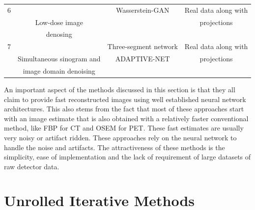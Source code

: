 \begin{table}[ht!]
\begin{tabular}{||c|c|c|c||}
		\hline
		6         & \cite{yang2018low}        &    Wasserstein-GAN & Real data along with            \\ 
		          & Low-dose image            &                    & projections                     \\ 
		          & denosing                  &                    &                                 \\ 
		\hline
		7         & \cite{zhu2020low}         &  Three-segment network  & Real data along with            \\ 
		          & Simultaneous sinogram and &  ADAPTIVE-NET      & projections                     \\ 
	 	          & image domain denoising    &                    &                                 \\ 
		\hline
		
	\end{tabular}
	
\end{table}

An important aspect of the methods discussed in this section is that they all claim to provide fast reconstructed images using well established neural network architectures. This also stems from the fact that most of these approaches start with an image estimate that is also obtained with a relatively faster conventional method, like \ac{FBP} for \ac{CT} and \ac{OSEM} for \ac{PET}. These fast estimates are usually very noisy or artifact ridden. These approaches rely on the neural network to handle the noise and artifacts. The attractiveness of these methods is the simplicity, ease of implementation and the lack of requirement of large datasets of raw detector data. 

\section{Unrolled Iterative Methods}

